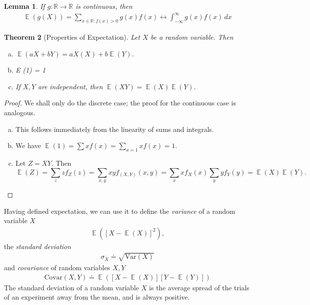 \documentclass[12pt]{article}
\newcommand{\rr}{\mathbb{R}}
\DeclareMathOperator{\ex}{\mathbb{E}}
\newcommand{\var}{\mathrm{Var}}
\newcommand{\covar}{\mathrm{Covar}}
\theoremstyle{plain}
\newtheorem{theorem}{Theorem}
\newtheorem{lemma}[theorem]{Lemma}
\theoremstyle{definition}
\theoremstyle{remark}
\numberwithin{equation}{section}  %
\begin{document}
\begin{lemma}
	If $g: \rr \to \rr$ is continuous, then
	\begin{align*}
		\ex(g(X)) = \sum_{x \in \rr: f(x) > 0} g(x) f(x) \longleftrightarrow
		\int_{-\infty}^{\infty} g(x) f(x) \, dx
	\end{align*}
\end{lemma}
\begin{theorem}[Properties of Expectation]
	Let $X$ be a random variable. Then
	\begin{enumerate}[(a)]
		\item $\ex(a X + b Y) = a X(X) + b \ex(Y)$.
		\item E (1) = 1
		\item If $X,Y$ are independent, then $\ex(XY) = \ex(X)\ex(Y)$.
	\end{enumerate}
\end{theorem}
\begin{proof}
	We shall only do the discrete case; the proof for the continuous case is
	analogous.
	\begin{enumerate}[(a)]
		\item This follows immediately from the linearity of sums and integrals.
		\item
			We have $\ex(1) = \sum x f(x) = \sum_{x = 1} x f(x) = 1$.
		\item
			Let $Z = XY$. Then
			\[\ex(Z) = \sum_{z} z f_Z(z) = \sum_{x,y} x y f_{(X,Y)}(x,y) = \sum_x 
				x f_X(x)
			\sum_y y f_Y(y) = \ex(X) \ex(Y).\]
	\end{enumerate}
\end{proof}
Having defined expectation, we can use it to define the
\emph{variance} of a random variable $X$
\begin{align*}
	\ex({[X - \ex(X)]}^2),
\end{align*}
the \emph{standard deviation}
\begin{align*}
	\sigma_X \doteq \sqrt{\var(X)}
\end{align*}
and \emph{covariance} of random variables $X, Y$
\begin{align*}
	\covar(X,Y) \doteq \ex([X - \ex(X)][Y - \ex(Y)])
\end{align*}
The standard deviation of a random variable $X$ is the average spread of the
trials of an experiment away from the mean, and is always positive. 
\end{document}
